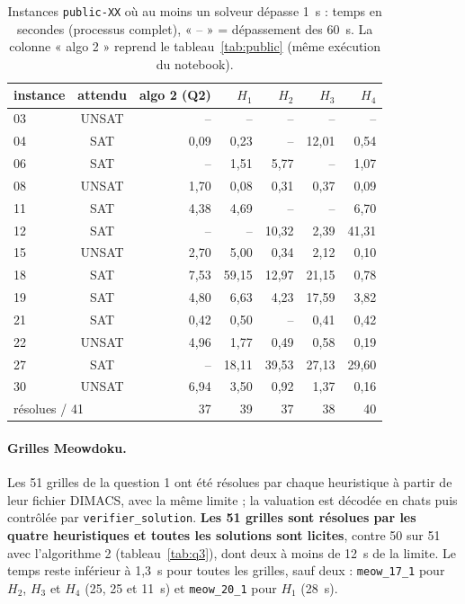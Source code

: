 \documentclass[11pt,a4paper]{article}
\begin{document}
\begin{table}[h]
  \centering\small
  \begin{tabular}{lcrrrrr}
    \toprule
    instance & attendu & algo 2 (Q2) & $H_1$ & $H_2$ & $H_3$ & $H_4$\\
    \midrule
    03 & UNSAT &    -- &    -- &    -- &    -- &    --\\
    04 & SAT   &  0,09 &  0,23 &    -- & 12,01 &  0,54\\
    06 & SAT   &    -- &  1,51 &  5,77 &    -- &  1,07\\
    08 & UNSAT &  1,70 &  0,08 &  0,31 &  0,37 &  0,09\\
    11 & SAT   &  4,38 &  4,69 &    -- &    -- &  6,70\\
    12 & SAT   &    -- &    -- & 10,32 &  2,39 & 41,31\\
    15 & UNSAT &  2,70 &  5,00 &  0,34 &  2,12 &  0,10\\
    18 & SAT   &  7,53 & 59,15 & 12,97 & 21,15 &  0,78\\
    19 & SAT   &  4,80 &  6,63 &  4,23 & 17,59 &  3,82\\
    21 & SAT   &  0,42 &  0,50 &    -- &  0,41 &  0,42\\
    22 & UNSAT &  4,96 &  1,77 &  0,49 &  0,58 &  0,19\\
    27 & SAT   &    -- & 18,11 & 39,53 & 27,13 & 29,60\\
    30 & UNSAT &  6,94 &  3,50 &  0,92 &  1,37 &  0,16\\
    \midrule
    \multicolumn{2}{l}{résolues / 41} & 37 & 39 & 37 & 38 & 40\\
    \bottomrule
  \end{tabular}
  \caption{Instances \texttt{public-XX} où au moins un solveur dépasse 1~s : temps en secondes
  (processus complet), « -- » = dépassement des 60~s. La colonne « algo 2 » reprend le
  tableau~\ref{tab:public} (même exécution du notebook).}
  \label{tab:q4}
\end{table}

\paragraph{Grilles Meowdoku.} Les 51 grilles de la question 1 ont été résolues par chaque
heuristique à partir de leur fichier DIMACS, avec la même limite ; la valuation est décodée en
chats puis contrôlée par \texttt{verifier\_solution}. \textbf{Les 51 grilles sont résolues par
les quatre heuristiques et toutes les solutions sont licites}, contre 50 sur 51 avec
l'algorithme 2 (tableau~\ref{tab:q3}), dont deux à moins de 12~s de la limite. Le temps reste inférieur à 1,3~s pour toutes les grilles, sauf
deux : \texttt{meow\_17\_1} pour $H_2$, $H_3$ et $H_4$ (25, 25 et 11~s) et \texttt{meow\_20\_1}
pour $H_1$ (28~s).
\end{document}
